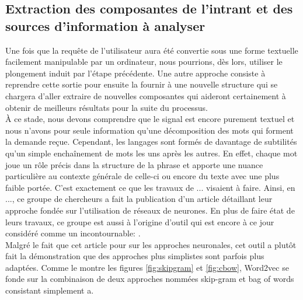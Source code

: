 \documentclass[11pt]{article}
\begin{document}
\subsection{Extraction des composantes de l'intrant et des sources d'information à analyser}
Une fois que la requête de l'utilisateur aura été convertie sous une forme textuelle facilement manipulable par un ordinateur, nous pourrions, dès lors, utiliser le plongement induit par l'étape précédente. Une autre approche consiste à reprendre cette sortie pour ensuite la fournir à une nouvelle structure qui se chargera d'aller extraire de nouvelles composantes qui aideront certainement à obtenir de meilleurs résultats pour la suite du processus. \\

À ce stade, nous devons comprendre que le signal est encore purement textuel et nous n'avons pour seule information qu'une décomposition des mots qui forment la demande reçue. Cependant, les langages sont formés de davantage de subtilités qu'un simple enchaînement de mots les uns après les autres. En effet, chaque mot joue un rôle précis dans la structure de la phrase et apporte une nuance particulière au contexte générale de celle-ci ou encore du texte avec une plus faible portée. C'est exactement ce que les travaux de ... visaient à faire. Ainsi, en ..., ce groupe de chercheurs a fait la publication d'un article détaillant leur approche fondée sur l'utilisation de réseaux de neurones. En plus de faire état de leurs travaux, ce groupe est aussi à l'origine d'outil qui est encore à ce jour considéré comme un incontournable: \cite{word2vec}. \\

Malgré le fait que cet article pour sur les approches neuronales, cet outil a plutôt fait la démonstration que des approches plus simplistes sont parfois plus adaptées. Comme le montre les figures \autoref{fig:skipgram} et \autoref{fig:cbow}, Word2vec se fonde sur la combinaison de deux approches nommées skip-gram et bag of words consistant simplement a. \\
\end{document}
